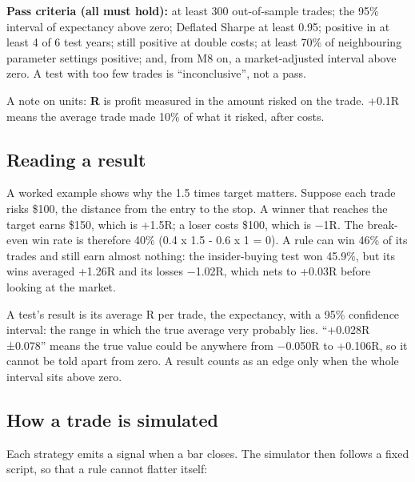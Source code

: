 \documentclass[11pt,a4paper]{article}
\begin{document}
\textbf{Pass criteria (all must hold):} at least 300 out-of-sample trades; the 95\% interval of expectancy above zero; Deflated
Sharpe at least 0.95; positive in at least 4 of 6 test years; still positive at double costs; at least 70\% of
neighbouring parameter settings positive; and, from M8 on, a market-adjusted interval above zero. A test with too few
trades is ``inconclusive'', not a pass.

A note on units: \textbf{R} is profit measured in the amount risked on the trade. +0.1R means the average trade made 10\% of
what it risked, after costs.

\subsection{Reading a result}\label{reading-a-result}

A worked example shows why the 1.5 times target matters. Suppose each trade risks \$100, the distance from the entry to the
stop. A winner that reaches the target earns \$150, which is +1.5R; a loser costs \$100, which is −1R. The break-even win rate
is therefore 40\% (0.4 x 1.5 - 0.6 x 1 = 0). A rule can win 46\% of its trades and still earn almost nothing: the insider-buying
test won 45.9\%, but its wins averaged +1.26R and its losses −1.02R, which nets to +0.03R before looking at the market.

A test's result is its average R per trade, the expectancy, with a 95\% confidence interval: the range in which the true
average very probably lies. ``+0.028R ±0.078'' means the true value could be anywhere from −0.050R to +0.106R, so it cannot
be told apart from zero. A result counts as an edge only when the whole interval sits above zero.

\subsection{How a trade is simulated}\label{how-a-trade-is-simulated}

Each strategy emits a signal when a bar closes. The simulator then follows a fixed script, so that a rule cannot flatter itself:
\end{document}
